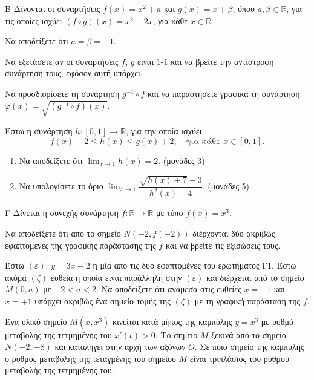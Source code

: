 \begin{thema}{Β}
Δίνονται οι συναρτήσεις $f(x) = x^2 + a$ και $g(x) = x + \beta$, όπου $a, \beta \in \mathbb{R}$, για τις οποίες ισχύει $(f \circ g)(x) = x^2 - 2x$, για κάθε $x \in \mathbb{R}$.
\begin{erwthma}
    \item Να αποδείξετε ότι $a = \beta = -1$. 

    \item Να εξετάσετε αν οι συναρτήσεις $f$, $g$ είναι $1$-$1$ και να βρείτε την αντίστροφη συνάρτησή τους, εφόσον αυτή υπάρχει. 

    \item Να προσδιορίσετε τη συνάρτηση $g^{-1} \circ f$ και να παραστήσετε γραφικά τη συνάρτηση $\varphi(x) = \sqrt{(g^{-1} \circ f)(x)}$. 

    \item Έστω η συνάρτηση $h: [0,1] \to \mathbb{R}$, για την οποία ισχύει
    \[
    f(x) + 2 \leq h(x) \leq g(x) + 2, \quad \text{για κάθε } x \in [0,1].
    \]
    \begin{enumerate}[label=\roman*)]
        \item Να αποδείξετε ότι $\displaystyle\lim_{x \to 1} h(x) = 2$. \hfill(μονάδες 3)
        \item Να υπολογίσετε το όριο $\displaystyle\lim_{x \to 1} \dfrac{\sqrt{h(x)+7} - 3}{h^2(x) - 4}$. \hfill(μονάδες 5)
    \end{enumerate}
\end{erwthma}
\end{thema}

\begin{thema}{Γ}
Δίνεται η συνεχής συνάρτηση $f: \mathbb{R} \to \mathbb{R}$ με τύπο $f(x) = x^3$.
\begin{erwthma}
    \item Να αποδείξετε ότι από το σημείο $N(-2, f(-2))$ διέρχονται δύο ακριβώς εφαπτομένες της γραφικής παράστασης της $f$ και να βρείτε τις εξισώσεις τους. 

    \item Έστω $(\varepsilon)$: $y = 3x - 2$ η μία από τις δύο εφαπτομένες του ερωτήματος Γ1. Έστω ακόμα $(\zeta)$ ευθεία η οποία είναι παράλληλη στην $(\varepsilon)$ και διέρχεται από το σημείο $M(0, a)$ με $-2 < a < 2$. Να αποδείξετε ότι ανάμεσα στις ευθείες $x = -1$ και $x = +1$ υπάρχει ακριβώς ένα σημείο τομής της $(\zeta)$ με τη γραφική παράσταση της $f$. 

    \item Ένα υλικό σημείο $M(x, x^3)$ κινείται κατά μήκος της καμπύλης $y = x^3$ με ρυθμό μεταβολής της τετμημένης του $x'(t) > 0$. Το σημείο $M$ ξεκινά από το σημείο $N(-2, -8)$ και καταλήγει στην αρχή των αξόνων $O$. Σε ποιο σημείο της καμπύλης ο ρυθμός μεταβολής της τεταγμένης του σημείου $M$ είναι τριπλάσιος του ρυθμού μεταβολής της τετμημένης του; 
\end{erwthma}
\end{thema}

